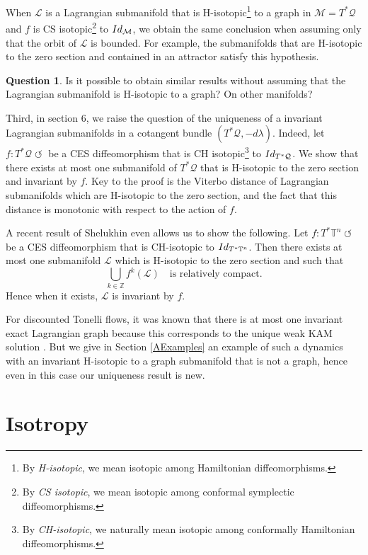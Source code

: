 \documentclass[11pt]{article}
\numberwithin{equation}{section}
\numberwithin{figure}{section}
\numberwithin{table}{section}
\providecommand{\righttoleftarrow}{\mathrel{\circlearrowleft}}
\theoremstyle{definition}
\newtheorem*{question*}{Question}
\def\Z{\mathbb{Z}}
\def\T{\mathbb{T}}
\def\cL{{\mathcal L}}
\def\cM{{\mathcal M}}
\def\cQ{{\mathcal Q}}
\begin{document}
When $\cL$ is a Lagrangian submanifold that is H-isotopic\footnote{By \emph{H-isotopic}, we mean isotopic among Hamiltonian diffeomorphisms.} to a graph in $\cM=T^*\cQ$ and $f$ is CS isotopic\footnote{By {\sl CS isotopic}, we mean isotopic among conformal symplectic diffeomorphisms.} to ${\rm Id}_\cM$, we obtain the same conclusion when assuming only that the orbit of $\cL$ is bounded. For example, the submanifolds that are H-isotopic to the zero section and contained in an attractor satisfy this hypothesis.

\begin{question*}
Is it possible to obtain similar results without assuming that the Lagrangian submanifold is H-isotopic to a graph? On other manifolds?
\end{question*}

Third, in section 6, we raise the question of the uniqueness of a invariant Lagrangian submanifolds in a cotangent bundle $(T^*\cQ, -d\lambda)$. Indeed, let $f:T^*\cQ \righttoleftarrow$ be a CES diffeomorphism that is CH isotopic\footnote{By \emph{CH-isotopic}, we naturally mean isotopic among conformally Hamiltonian diffeomorphisms.} to ${\rm Id}_{T^*\cQ}$. We show that there exists at most one submanifold of $T^*\cQ$ that is H-isotopic to the zero section and invariant by $f$. Key to the proof is the Viterbo distance of Lagrangian submanifolds which are H-isotopic to the zero section, and the fact that this distance is monotonic with respect to the action of $f$.

A recent result of Shelukhin even allows us to show the following. Let $f:T^*\T^n \righttoleftarrow$ be a CES diffeomorphism that is CH-isotopic to ${\rm Id}_{T^*\T^n}$. Then there exists at most one submanifold $\cL$ which is H-isotopic to the zero section and such that
\[
\bigcup_{k\in\Z}f^k(\cL)\quad\text{is relatively compact}.
\]
Hence when it exists, $\cL$ is invariant by $f$.

For discounted Tonelli flows, it was known that there is at most one invariant exact Lagrangian graph because this corresponds to the unique weak KAM solution \cite{MarSor2017}. But we give in Section \ref{AExamples} an example of such a dynamics with an invariant H-isotopic to a graph submanifold that is not a graph, hence even in this case our uniqueness result is new.

\section{Isotropy}\label{Sisotropy}
\end{document}
